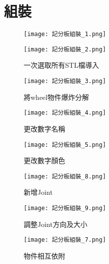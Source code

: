 \newpage

\section{組裝}
{
\begin{figure}[hbt!]
  \centering
  \texttt{[image: 記分板組裝\_1.png]}
\end{figure}
\begin{figure}[hbt!]
  \centering
  \texttt{[image: 記分板組裝\_2.png]}
  \caption{一次選取所有STL檔導入}
  \label{fig:photo13}
\end{figure}

\begin{figure}[hbt!]
  \begin{center}
    \texttt{[image: 記分板組裝\_3.png]}
  \end{center}
  \caption{將wheel物件爆炸分解}
  \label{fig:photo}
\end{figure}

\begin{figure}[hbt!]
  \begin{center}
    \texttt{[image: 記分板組裝\_4.png]}
  \end{center}
  \caption{更改數字名稱}
  \label{fig:photo}
\end{figure}

\begin{figure}[hbt!]
  \begin{center}
    \texttt{[image: 記分板組裝\_5.png]}
  \end{center}
  \caption{更改數字顏色}
  \label{fig:photo}
\end{figure}

\begin{figure}[hbt!]
  \begin{center}
    \texttt{[image: 記分板組裝\_8.png]}
  \end{center}
  \caption{新增Joint}
  \label{fig:photo}
\end{figure}

\begin{figure}[hbt!]
  \begin{center}
    \texttt{[image: 記分板組裝\_9.png]}
  \end{center}
  \caption{調整Joint方向及大小}
  \label{fig:photo}
\end{figure}

\begin{figure}[hbt!]
  \begin{center}
    \texttt{[image: 記分板組裝\_7.png]}
  \end{center}
  \caption{物件相互依附}
  \label{fig:photo}
\end{figure}

}

